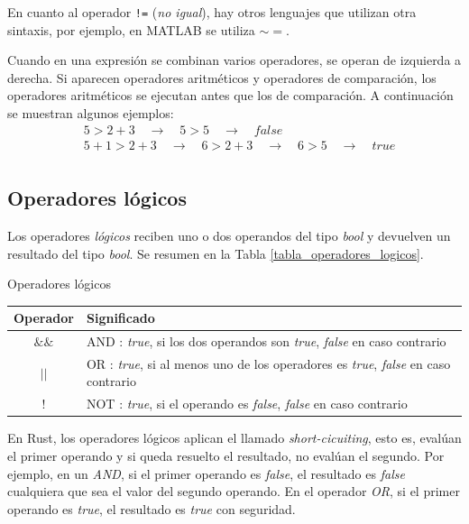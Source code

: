 En cuanto al operador \texttt{!=} (\textit{no igual}), hay otros lenguajes que utilizan otra sintaxis, por ejemplo, en MATLAB se utiliza $\sim =$.

Cuando en una expresión se combinan varios operadores, se operan de izquierda a derecha. Si aparecen operadores aritméticos y operadores de comparación, los operadores aritméticos se ejecutan antes que los de comparación. A continuación se muestran algunos ejemplos:
\begin{align*}
   & 5 > 2 + 3 \quad \rightarrow \quad 5 > 5 \quad \rightarrow \quad false\\
   & 5 + 1 > 2 + 3 \quad \rightarrow \quad 6 > 2 + 3 \quad \rightarrow \quad 6 > 5 \quad \rightarrow \quad true\\
\end{align*}


\subsection{Operadores lógicos}
\noindent Los operadores \textit{lógicos} reciben uno o dos operandos del tipo \textit{bool} y devuelven un resultado del tipo \textit{bool}. Se resumen en la Tabla \ref{tabla_operadores_logicos}.

\begin{center}
   \begin{mytable}[label=tabla_operadores_logicos]{\centering\footnotesize Operadores lógicos}
      \footnotesize
      \begin{tabular}{c l}
         \hline
         \textbf{Operador} & \textbf{Significado} \\ \hline
         $\&\&$ & AND : \textit{true}, si los dos operandos son \textit{true}, \textit{false} en caso contrario \\
         $||$ & OR : \textit{true}, si al menos uno de los operadores es \textit{true}, \textit{false} en caso contrario \\
         $!$ & NOT : \textit{true}, si el operando es \textit{false}, \textit{false} en caso contrario\\
      \end{tabular}
   \end{mytable}
\end{center}

En Rust, los operadores lógicos aplican el llamado \textit{short-cicuiting}, esto es, evalúan el primer operando y si queda resuelto el resultado, no evalúan el segundo. Por ejemplo, en un \textit{AND}, si el primer operando es \textit{false}, el resultado es \textit{false} cualquiera que sea el valor del segundo operando. En el operador \textit{OR}, si el primer operando es \textit{true}, el resultado es \textit{true} con seguridad.

